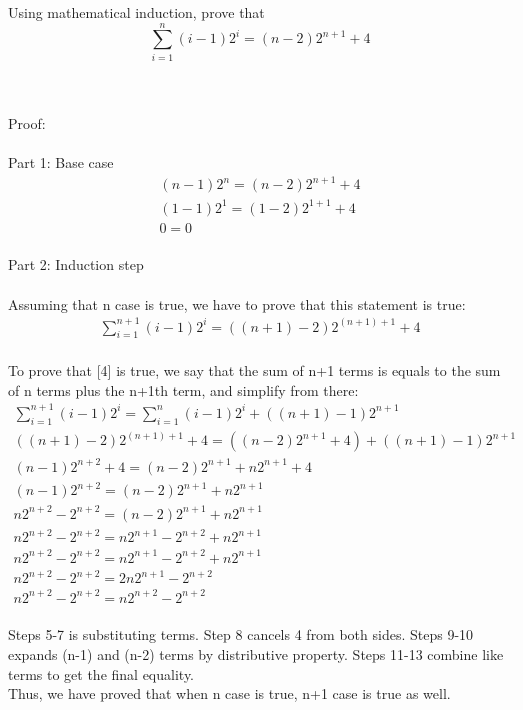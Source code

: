  \item[8] Using mathematical induction, prove that
 \begin{displaymath}
 \sum_{i=1}^n (i-1) 2^i = (n-2)2^{n+1}
 + 4
 \end{displaymath}
 
 \begin{Questions}
 \\{\color{NavyBlue}
 \\Proof:
 \\
 \\Part 1: Base case
 \begin{gather}
 (n-1) 2^n = (n-2)2^{n+1}+ 4
 \\(1-1) 2^1 = (1-2)2^{1+1}+ 4
 \\0 = 0
 \end{gather}
 \\Part 2: Induction step
 \\
 \\ Assuming that n case is true, we have to prove that this statement is true: 
 \begin{gather}
 \sum_{i=1}^{n+1} (i-1) 2^i = ((n+1)-2)2^{(n+1)+1}+ 4
 \end{gather}
 \\To prove that [4] is true, we say that the sum of n+1 terms is equals to the sum of n terms plus the n+1th term, and simplify from there:
  \begin{gather}
 \sum_{i=1}^{n+1} (i-1) 2^i = \sum_{i=1}^n (i-1) 2^i + ((n+1)-1) 2^{n+1}
 \\ ((n+1)-2)2^{(n+1)+1}+ 4 = ((n-2)2^{n+1}
 + 4) + ((n+1)-1) 2^{n+1}
 \\ (n-1)2^{n+2}+ 4 = (n-2)2^{n+1}
  + n 2^{n+1} + 4
  \\ (n-1)2^{n+2}= (n-2)2^{n+1}
  + n 2^{n+1}
   \\ n2^{n+2} - 2^{n+2} = (n-2)2^{n+1}
  + n 2^{n+1}
   \\ n2^{n+2} - 2^{n+2} = n2^{n+1} - 2^{n+2}
  + n 2^{n+1}
    \\ n2^{n+2} - 2^{n+2} = n2^{n+1} - 2^{n+2}
  + n 2^{n+1}
     \\ n2^{n+2} - 2^{n+2} = 2n2^{n+1} - 2^{n+2}
     \\ n2^{n+2} - 2^{n+2} = n2^{n+2} - 2^{n+2}
 \end{gather}
 \\Steps 5-7 is substituting terms. Step 8 cancels 4 from both sides. Steps 9-10 expands (n-1) and (n-2) terms by distributive property. Steps 11-13 combine like terms to get the final equality. 
 \\Thus, we have proved that when n case is true, n+1 case is true as well. 
}
\end{Questions}
